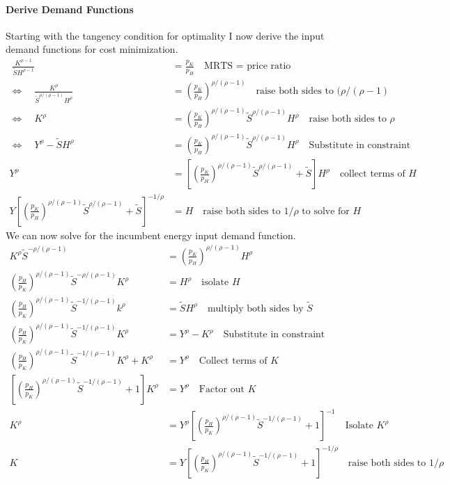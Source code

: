 \documentclass[a4paper, 14pt]{article}
\begin{document}
\paragraph{Derive Demand Functions}
Starting with the tangency condition for optimality I now derive the input demand functions for cost minimization.
\begin{align}
     \; \frac{K^{\rho-1}}{\tilde{S}H^{\rho-1}} &= \frac{p_K}{p_H} \quad \text{MRTS = price ratio} \nonumber \\
     \iff\quad \frac{K^{\rho}}{\tilde{S}^{\rho/(\rho-1)}H^{\rho}} &= \left(\frac{p_K}{p_H}\right)^{\rho/(\rho-1)} \quad \text{raise both sides to }(\rho/(\rho-1) \nonumber \\
     \iff\quad K^{\rho} &= \left(\frac{p_K}{p_H}\right)^{\rho/(\rho-1)} \tilde{S}^{\rho/(\rho-1)} H^{\rho} \quad \text{raise both sides to }\rho \nonumber \\
     \iff\quad Y^{\rho}-\tilde{S}H^{\rho} &= \left(\frac{p_K}{p_H}\right)^{\rho/(\rho-1)}\tilde{S}^{\rho/(\rho-1)} H^{\rho} \quad \text{Substitute in constraint} \nonumber \\
     Y^{\rho} &= \left[ \left(\frac{p_K}{p_H}\right)^{\rho/(\rho-1)}\tilde{S}^{\rho/(\rho-1)} + \tilde{S} \right] H^{\rho} \quad \text{collect terms of } H \nonumber \\
     Y \left[ \left(\frac{p_K}{p_H}\right)^{\rho/(\rho-1)}\tilde{S}^{\rho/(\rho-1)} + \tilde{S} \right]^{-1/\rho} &= H \quad \text{raise both sides to }1/\rho \text{ to solve for }H \nonumber
\end{align}
We can now solve for the incumbent energy input demand function.
\begin{align}
    K^{\rho}\tilde{S}^{-\rho/(\rho-1)} &= \left(\frac{p_K}{p_H}\right)^{\rho/(\rho-1)} H^{\rho} \nonumber \\
    \left(\frac{p_H}{p_K}\right)^{\rho/(\rho-1)}\tilde{S}^{-\rho/(\rho-1)} K^{\rho} &= H^{\rho} \quad \text{isolate } H \nonumber \\
    \left(\frac{p_H}{p_K}\right)^{\rho/(\rho-1)}\tilde{S}^{-1/(\rho-1)} k^{\rho} &= \tilde{S} H^{\rho} \quad \text{multiply both sides by }\tilde{S} \nonumber \\
    \left(\frac{p_H}{p_K}\right)^{\rho/(\rho-1)}\tilde{S}^{-1/(\rho-1)} K^{\rho} &= Y^{\rho} - K^{\rho} \quad \text{Substitute in constraint} \nonumber \\
     \left(\frac{p_H}{p_K}\right)^{\rho/(\rho-1)}\tilde{S}^{-1/(\rho-1)} K^{\rho} + K^{\rho} &= Y^{\rho} \quad \text{Collect terms of } K \nonumber \\
     \left[ \left(\frac{p_H}{p_K}\right)^{\rho/(\rho-1)}\tilde{S}^{-1/(\rho-1)} + 1 \right] K^{\rho} &= Y^{\rho} \quad \text{Factor out } K \nonumber \\
     K^{\rho} &= Y^{\rho} \left[ \left(\frac{p_H}{p_K}\right)^{\rho/(\rho-1)}\tilde{S}^{-1/(\rho-1)} + 1 \right]^{-1} \quad \text{Isolate } K^{\rho} \nonumber \\
     K &= Y \left[ \left(\frac{p_H}{p_K}\right)^{\rho/(\rho-1)}\tilde{S}^{-1/(\rho-1)} + 1 \right]^{-1/\rho} \quad \text{raise both sides to }1/\rho \nonumber 
\end{align}
\end{document}
